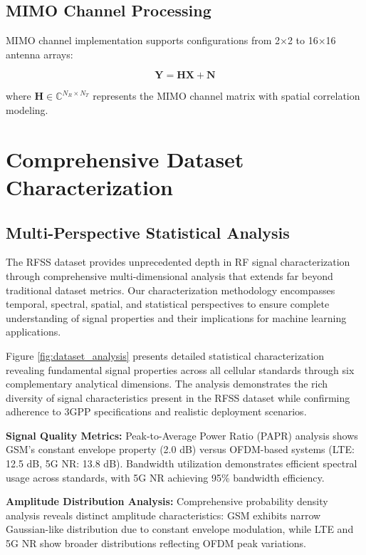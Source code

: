 \documentclass[twocolumn]{article}
\begin{document}
\subsection{MIMO Channel Processing}

MIMO channel implementation supports configurations from 2×2 to 16×16 antenna arrays:

\begin{equation}
\mathbf{Y} = \mathbf{H} \mathbf{X} + \mathbf{N}
\end{equation}

where $\mathbf{H} \in \mathbb{C}^{N_R \times N_T}$ represents the MIMO channel matrix with spatial correlation modeling.

\section{Comprehensive Dataset Characterization}

\subsection{Multi-Perspective Statistical Analysis}

The RFSS dataset provides unprecedented depth in RF signal characterization through comprehensive multi-dimensional analysis that extends far beyond traditional dataset metrics. Our characterization methodology encompasses temporal, spectral, spatial, and statistical perspectives to ensure complete understanding of signal properties and their implications for machine learning applications.

Figure \ref{fig:dataset_analysis} presents detailed statistical characterization revealing fundamental signal properties across all cellular standards through six complementary analytical dimensions. The analysis demonstrates the rich diversity of signal characteristics present in the RFSS dataset while confirming adherence to 3GPP specifications and realistic deployment scenarios.

\textbf{Signal Quality Metrics:} Peak-to-Average Power Ratio (PAPR) analysis shows GSM's constant envelope property (2.0 dB) versus OFDM-based systems (LTE: 12.5 dB, 5G NR: 13.8 dB). Bandwidth utilization demonstrates efficient spectral usage across standards, with 5G NR achieving 95\% bandwidth efficiency.

\textbf{Amplitude Distribution Analysis:} Comprehensive probability density analysis reveals distinct amplitude characteristics: GSM exhibits narrow Gaussian-like distribution due to constant envelope modulation, while LTE and 5G NR show broader distributions reflecting OFDM peak variations.
\end{document}
